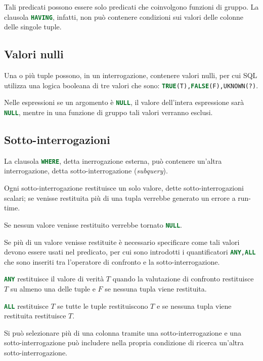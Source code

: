 Tali predicati possono essere solo predicati che coinvolgono funzioni di gruppo.
La clausola \lstinline[language=SQL]{HAVING}, infatti, non può contenere
condizioni sui valori delle colonne delle singole tuple.

\subsection{Valori nulli}%
\label{sub:Valori nulli}
Una o più tuple possono, in un interrogazione, contenere valori nulli, per cui
SQL utilizza una logica booleana di tre valori che sono:
\lstinline[language=SQL]{TRUE(T),FALSE(F),UKNOWN(?)}.

Nelle espressioni se un argomento è \lstinline[language=SQL]{NULL}, il valore
dell'intera espressione sarà \lstinline[language=SQL]{NULL}, mentre in una
funzione di gruppo tali valori verranno esclusi.

\subsection{Sotto-interrogazioni}%
\label{sub:Sotto-interrogazioni}
La clausola \lstinline[language=SQL]{WHERE}, detta inerrogazione esterna, può
contenere un'altra interrogazione, detta sotto-interrogazione
(\textit{subquery}).

Ogni sotto-interrogazione restituisce un solo valore, dette sotto-interrogazioni
scalari; se venisse restituita più di una tupla verrebbe generato un errore a
run-time.

Se nessun valore venisse restituito verrebbe tornato
\lstinline[language=SQL]{NULL}.

Se più di un valore venisse restituite è necessario specificare come tali valori
devono essere usati nel predicato, per cui sono introdotti i quantificatori
\lstinline[language=SQL]{ANY,ALL} che sono inseriti tra l'operatore di confronto
e la sotto-interrogazione.

\lstinline[language=SQL]{ANY} restituisce il valore di verità $T$ quando la
valutazione di confronto restituisce $T$ su almeno una delle tuple e $F$ se
nessuna tupla viene restituita.

\lstinline[language=SQL]{ALL} restituisce $T$ se tutte le tuple restituiscono
$T$ e se nessuna tupla viene restituita restituisce $T$.

Si può selezionare più di una colonna tramite una sotto-interrogazione e una
sotto-interrogazione può includere nella propria condizione di ricerca un'altra
sotto-interrogazione.
